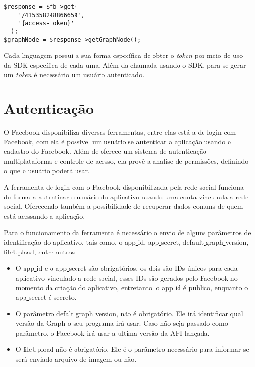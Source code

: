\begin{lstlisting}[caption={Obtendo Token de uma única página},label={lst:tokenunico}]
  $response = $fb->get(
    '/415358248866659',
    '{access-token}'
  );
$graphNode = $response->getGraphNode();
\end{lstlisting}

Cada linguagem possui a sua forma específica de obter o \textit{token} por meio do uso da SDK específica de cada uma. Além da chamada usando o SDK, para se gerar um \textit{token} é necessário um usuário autenticado.

\section{Autenticação}
O Facebook disponibiliza diversas ferramentas, entre elas está a de login com Facebook, com ela é possível um usuário se autenticar a aplicação usando o cadastro do Facebook. Além de oferece um sistema de autenticação multiplataforma e controle de acesso, ela provê a analise de permissões, definindo o que o usuário poderá usar. \cite{facebook2018c}

A ferramenta de login com o Facebook disponibilizada pela rede social funciona de forma a autenticar o usuário do aplicativo usando uma conta vinculada a rede social. Oferecendo também a possibilidade de recuperar dados comuns de quem está acessando a aplicação.

Para o funcionamento da ferramenta é necessário o envio de alguns parâmetros de identificação do aplicativo, tais como, o app\underline{{ }}id, app\underline{{ }}secret, default\underline{{ }}graph\underline{{ }}version, fileUpload, entre outros.

\begin{itemize}
\item O app\underline{{ }}id e o app\underline{{ }}secret são obrigatórios, os dois são IDs únicos para cada aplicativo vinculado a rede social, esses IDs são gerados pelo Facebook no momento da criação do aplicativo, entretanto, o app\underline{{ }}id é publico, enquanto o app\underline{{ }}secret é secreto.

\item O parâmetro defalt\underline{{ }}graph\underline{{ }}version, não é obrigatório. Ele irá identificar qual versão da Graph o seu programa irá usar. Caso não seja passado como parâmetro, o Facebook irá usar a ultima versão da API lançada.

\item O fileUpload não é obrigatório. Ele é o parâmetro necessário para informar se será enviado arquivo de imagem ou não.
\end{itemize}

